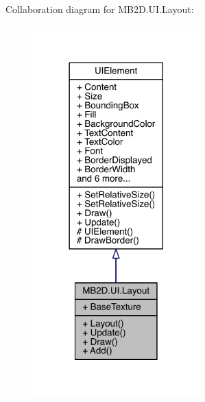 Collaboration diagram for M\+B2\+D.\+U\+I.\+Layout\+:\nopagebreak
\begin{figure}[H]
\begin{center}
\leavevmode
\includegraphics[width=182pt]{class_m_b2_d_1_1_u_i_1_1_layout__coll__graph}
\end{center}
\end{figure}
